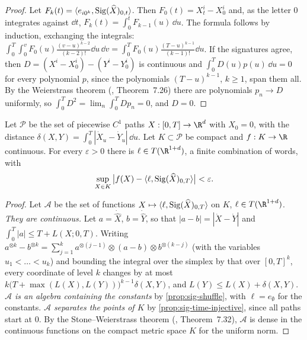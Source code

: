\begin{proof}
Let $F_k(t)=\langle e_{i0^k},\operatorname{Sig}(\widehat X)_{0,t}\rangle$. Then $F_0(t)=X^i_t-X^i_0$ and, as the letter $0$
integrates against $\dd t$, $F_k(t)=\int_0^tF_{k-1}(u)\,\dd u$. The formula follows by induction, exchanging
the integrals: $\int_0^T\!\int_0^vF_0(u)\frac{(v-u)^{k-2}}{(k-2)!}\dd u\,\dd v=\int_0^TF_0(u)\frac{(T-u)^{k-1}}{(k-1)!}\dd u$.
If the signatures agree, then $D=(X^i-X^i_0)-(Y^i-Y^i_0)$ is continuous and $\int_0^TD(u)p(u)\,\dd u=0$ for
every polynomial $p$, since the polynomials $(T-u)^{k-1}$, $k\ge1$, span them all. By the Weierstrass
theorem (\textcite{rudin-pma}, Theorem~7.26) there are polynomials $p_n\to D$ uniformly, so
$\int_0^TD^2=\lim_n\int_0^TDp_n=0$, and $D=0$.
\end{proof}

\begin{theorem}\label{thm:sig-universal}
Let $\mathcal P$ be the set of piecewise $C^1$ paths $X:[0,T]\to\R^d$ with $X_0=0$, with the distance
$\delta(X,Y)=\int_0^T|\dot X_u-\dot Y_u|\,\dd u$. Let $K\subset\mathcal P$ be compact and $f:K\to\R$
continuous. For every $\varepsilon>0$ there is $\ell\in T(\R^{1+d})$, a finite combination of words, with
\[
  \sup_{X\in K}\big|f(X)-\langle\ell,\operatorname{Sig}(\widehat X)_{0,T}\rangle\big|<\varepsilon .
\]
\end{theorem}

\begin{proof}
Let $\mathcal A$ be the set of functions $X\mapsto\langle\ell,\operatorname{Sig}(\widehat X)_{0,T}\rangle$ on $K$,
$\ell\in T(\R^{1+d})$. \emph{They are continuous.} Let $a=\dot{\widehat X}$, $b=\dot{\widehat Y}$, so that
$|a-b|=|\dot X-\dot Y|$ and $\int_0^T|a|\le T+L(X;0,T)$. Writing
$a^{\otimes k}-b^{\otimes k}=\sum_{j=1}^ka^{\otimes(j-1)}\otimes(a-b)\otimes b^{\otimes(k-j)}$ (with the variables
$u_1<\dots<u_k$) and bounding the integral over the simplex by that over $[0,T]^k$, every coordinate of
level $k$ changes by at most $k\big(T+\max(L(X),L(Y))\big)^{k-1}\delta(X,Y)$, and $L(Y)\le L(X)+\delta(X,Y)$.
\emph{$\mathcal A$ is an algebra containing the constants} by \cref{prop:sig-shuffle}, with $\ell=e_\emptyset$
for the constants. \emph{$\mathcal A$ separates the points of $K$} by \cref{prop:sig-time-injective}, since all
paths start at $0$. By the Stone--Weierstrass theorem (\textcite{rudin-pma}, Theorem~7.32), $\mathcal A$ is
dense in the continuous functions on the compact metric space $K$ for the uniform norm.
\end{proof}

